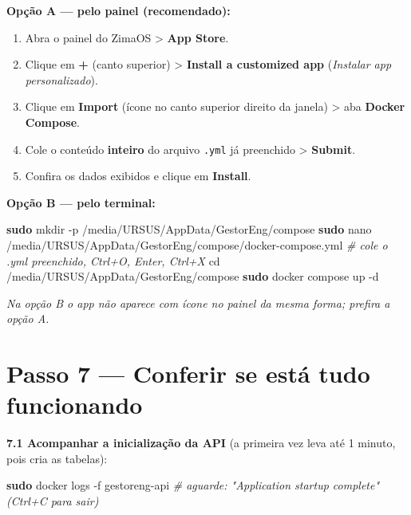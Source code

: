 \documentclass[
  10pt,
]{article}
\newenvironment{Shaded}{\begin{snugshade}}{\end{snugshade}}
\newcommand{\AttributeTok}[1]{\textcolor[rgb]{0.13,0.29,0.53}{#1}}
\newcommand{\BuiltInTok}[1]{#1}
\newcommand{\CommentTok}[1]{\textcolor[rgb]{0.56,0.35,0.01}{\textit{#1}}}
\newcommand{\FunctionTok}[1]{\textcolor[rgb]{0.13,0.29,0.53}{\textbf{#1}}}
\newcommand{\NormalTok}[1]{#1}
\providecommand{\tightlist}{%
  \setlength{\itemsep}{0pt}\setlength{\parskip}{0pt}}
\renewenvironment{quote}{\begin{oldquote}\small\itshape}{\end{oldquote}}
\begin{document}
\textbf{Opção A --- pelo painel (recomendado):}

\begin{enumerate}
\def\labelenumi{\arabic{enumi}.}
\tightlist
\item
  Abra o painel do ZimaOS \textgreater{} \textbf{App Store}.
\item
  Clique em \textbf{+} (canto superior) \textgreater{} \textbf{Install a
  customized app} (\emph{Instalar app personalizado}).
\item
  Clique em \textbf{Import} (ícone no canto superior direito da janela)
  \textgreater{} aba \textbf{Docker Compose}.
\item
  Cole o conteúdo \textbf{inteiro} do arquivo \texttt{.yml} já
  preenchido \textgreater{} \textbf{Submit}.
\item
  Confira os dados exibidos e clique em \textbf{Install}.
\end{enumerate}

\textbf{Opção B --- pelo terminal:}

\begin{Shaded}
\begin{Highlighting}[]
\FunctionTok{sudo}\NormalTok{ mkdir }\AttributeTok{{-}p}\NormalTok{ /media/URSUS/AppData/GestorEng/compose}
\FunctionTok{sudo}\NormalTok{ nano /media/URSUS/AppData/GestorEng/compose/docker{-}compose.yml   }\CommentTok{\# cole o .yml preenchido, Ctrl+O, Enter, Ctrl+X}
\BuiltInTok{cd}\NormalTok{ /media/URSUS/AppData/GestorEng/compose}
\FunctionTok{sudo}\NormalTok{ docker compose up }\AttributeTok{{-}d}
\end{Highlighting}
\end{Shaded}

\begin{quote}
Na opção B o app não aparece com ícone no painel da mesma forma; prefira
a opção A.
\end{quote}

\hypertarget{passo-7-conferir-se-estuxe1-tudo-funcionando}{%
\section{Passo 7 --- Conferir se está tudo
funcionando}\label{passo-7-conferir-se-estuxe1-tudo-funcionando}}

\textbf{7.1 Acompanhar a inicialização da API} (a primeira vez leva até
1 minuto, pois cria as tabelas):

\begin{Shaded}
\begin{Highlighting}[]
\FunctionTok{sudo}\NormalTok{ docker logs }\AttributeTok{{-}f}\NormalTok{ gestoreng{-}api}
\CommentTok{\# aguarde: "Application startup complete" (Ctrl+C para sair)}
\end{Highlighting}
\end{Shaded}
\end{document}
